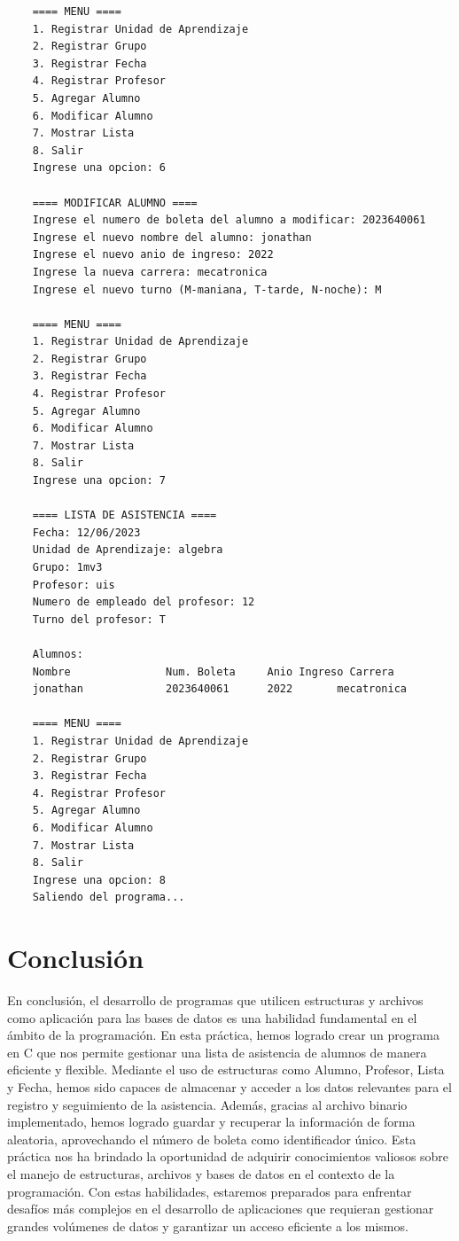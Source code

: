 \documentclass{article}
\begin{document}
\begin{lstlisting}
	==== MENU ====
	1. Registrar Unidad de Aprendizaje
	2. Registrar Grupo
	3. Registrar Fecha
	4. Registrar Profesor
	5. Agregar Alumno
	6. Modificar Alumno
	7. Mostrar Lista
	8. Salir
	Ingrese una opcion: 6
	
	==== MODIFICAR ALUMNO ====
	Ingrese el numero de boleta del alumno a modificar: 2023640061
	Ingrese el nuevo nombre del alumno: jonathan
	Ingrese el nuevo anio de ingreso: 2022
	Ingrese la nueva carrera: mecatronica
	Ingrese el nuevo turno (M-maniana, T-tarde, N-noche): M
	
	==== MENU ====
	1. Registrar Unidad de Aprendizaje
	2. Registrar Grupo
	3. Registrar Fecha
	4. Registrar Profesor
	5. Agregar Alumno
	6. Modificar Alumno
	7. Mostrar Lista
	8. Salir
	Ingrese una opcion: 7
	
	==== LISTA DE ASISTENCIA ====
	Fecha: 12/06/2023
	Unidad de Aprendizaje: algebra
	Grupo: 1mv3
	Profesor: uis
	Numero de empleado del profesor: 12
	Turno del profesor: T
	
	Alumnos:
	Nombre               Num. Boleta     Anio Ingreso Carrera
	jonathan             2023640061      2022       mecatronica
	
	==== MENU ====
	1. Registrar Unidad de Aprendizaje
	2. Registrar Grupo
	3. Registrar Fecha
	4. Registrar Profesor
	5. Agregar Alumno
	6. Modificar Alumno
	7. Mostrar Lista
	8. Salir
	Ingrese una opcion: 8
	Saliendo del programa...
	\end{lstlisting}
	
	\newpage
	
	\section{Conclusión}
	
	En conclusión, el desarrollo de programas que utilicen estructuras y archivos como aplicación para las bases de datos es una habilidad fundamental en el ámbito de la programación. En esta práctica, hemos logrado crear un programa en C que nos permite gestionar una lista de asistencia de alumnos de manera eficiente y flexible. Mediante el uso de estructuras como Alumno, Profesor, Lista y Fecha, hemos sido capaces de almacenar y acceder a los datos relevantes para el registro y seguimiento de la asistencia. Además, gracias al archivo binario implementado, hemos logrado guardar y recuperar la información de forma aleatoria, aprovechando el número de boleta como identificador único. Esta práctica nos ha brindado la oportunidad de adquirir conocimientos valiosos sobre el manejo de estructuras, archivos y bases de datos en el contexto de la programación. Con estas habilidades, estaremos preparados para enfrentar desafíos más complejos en el desarrollo de aplicaciones que requieran gestionar grandes volúmenes de datos y garantizar un acceso eficiente a los mismos.
	
\end{document}
